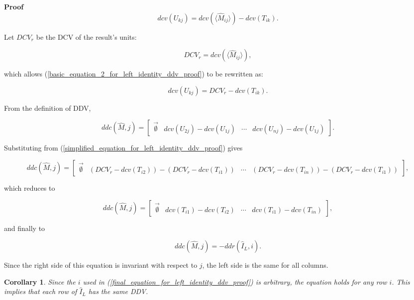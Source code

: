 \documentclass[10pt,letterpaper]{article}
\newtheorem{cor}{Corollary}[section]
\newenvironment{proof}{\noindent\textbf{Proof} }{\qed \newline}
\newcommand{\qed}{\nobreak \ifvmode \relax \else
      \ifdim\lastskip<1.5em \hskip-\lastskip
      \hskip1.5em plus0em minus0.5em \fi \nobreak
      \vrule height0.75em width0.5em depth0.25em\fi}
\numberwithin{equation}{section}
\begin{document}
\begin{proof}
\begin{equation} \label{basic_equation_2_for_left_identity_ddv_proof} dcv(U_{kj}) = dcv( \langle \hat M_{ij} \rangle ) - dcv(T_{ik}) . \end{equation}

Let $DCV_r$ be the DCV of the result's units:

\[ DCV_r = dcv( \langle \hat M_{ij} \rangle ) , \]

which allows (\ref{basic_equation_2_for_left_identity_ddv_proof}) to
be rewritten as:

\begin{equation} \label{simplified_equation_for_left_identity_ddv_proof} dcv(U_{kj}) = DCV_r - dcv(T_{ik}) . \end{equation}

From the definition of DDV,

\[ ddc(\hat M, j) = \left[ \begin{matrix} \vec{\emptyset} & dcv(U_{2j}) - dcv(U_{1j}) & \cdots & dcv(U_{nj}) - dcv(U_{1j}) \end{matrix} \right] . \]

Substituting from (\ref{simplified_equation_for_left_identity_ddv_proof}) gives

\[ ddc(\hat M, j) = \left[ \begin{matrix} \vec{\emptyset} & (DCV_r - dcv(T_{i2})) - (DCV_r - dcv(T_{i1})) & \cdots & (DCV_r - dcv(T_{in})) - (DCV_r - dcv(T_{i1})) \end{matrix} \right] , \]

which reduces to

\[ ddc(\hat M, j) = \left[ \begin{matrix} \vec{\emptyset} & dcv(T_{i1}) - dcv(T_{i2}) & \cdots & dcv(T_{i1}) - dcv(T_{in}) \end{matrix} \right] , \]

and finally to

\begin{equation} \label{final_equation_for_left_identity_ddv_proof} ddc(\hat M, j) = -ddr(\hat I_L, i) . \end{equation} 

Since the right side of this equation is invariant with respect to
$j$, the left side is the same for all columns. \end{proof}

\begin{cor}Since the $i$ used in
  (\ref{final_equation_for_left_identity_ddv_proof}) is arbitrary, the
  equation holds for any row $i$.  This implies that each row of $\hat
  I_L$ has the same DDV.\end{cor}
\end{document}
